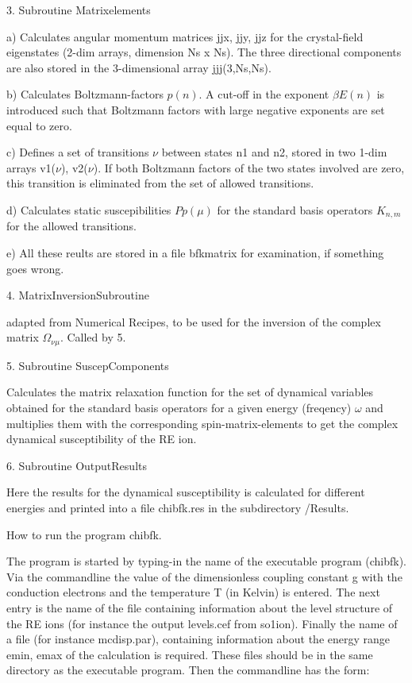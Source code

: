 3. Subroutine Matrixelements

a) Calculates angular momentum matrices jjx, jjy, jjz for the crystal-field eigenstates
(2-dim arrays, dimension Ns x Ns). The three directional components are also
stored in the 3-dimensional array jjj(3,Ns,Ns). 

b) Calculates Boltzmann-factors $p(n)$. A cut-off in the exponent $\beta
E(n)$ is introduced such that Boltzmann factors with large negative
exponents
are set equal to zero. 

c) Defines  a set of transitions  $\nu$  between states
n1 and n2, stored in two  1-dim
arrays v1($\nu$), v2($\nu$). If both Boltzmann factors of the two states
involved are zero, this transition is eliminated from the set of allowed
transitions.  

d) Calculates static suscepibilities $Pp(\mu)$ for the standard basis operators
$K_{n,m}$ for the allowed transitions.  

e) All these reults are stored in a  file bfkmatrix for examination, if
something goes wrong.
 

4. MatrixInversionSubroutine

adapted from Numerical Recipes, to be used for the inversion of the complex
matrix $\Omega_{\nu\mu}$. Called by 5. 

5. Subroutine SuscepComponents

Calculates the matrix relaxation function for the set of dynamical variables
obtained for the standard basis operators for a given energy (freqency)
$\omega$ and multiplies them with the corresponding spin-matrix-elements to
get the complex dynamical susceptibility of the RE ion.  

6. Subroutine OutputResults 

Here the results for the dynamical susceptibility is calculated for
different energies and printed into a file chibfk.res in the subdirectory
/Results.



\newpage
{\large How  to run the program chibfk}.

The program is started by typing-in the name of the  executable program (chibfk). 
Via the commandline the value of the dimensionless coupling 
constant g with the conduction electrons and the temperature T (in Kelvin) is
entered. The next entry is the name of the file containing information about
the level structure of  the RE ions (for instance the output levels.cef 
from so1ion). Finally the name
of a file (for instance mcdisp.par), containing information about 
the energy range emin, emax 
of  the calculation is required. These files should be in the same directory 
as the executable program.
Then the commandline has the form: 

